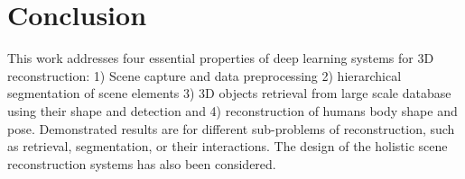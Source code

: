 \chapter{Conclusion}

This work addresses four essential properties of deep learning systems for 3D reconstruction: 1) Scene capture and data preprocessing 2) hierarchical segmentation of scene elements 3) 3D objects retrieval from large scale database using their shape and detection and 4) reconstruction of humans body shape and pose.  Demonstrated results are for different sub-problems of reconstruction, such as retrieval, segmentation, or their interactions. The design of the holistic scene reconstruction systems has also been considered.


